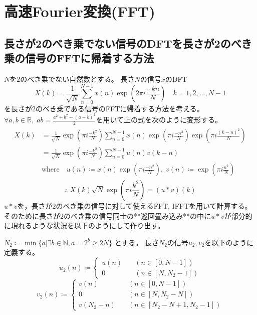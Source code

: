 \chapter{高速Fourier変換(FFT)}
    \section{長さが2のべき乗でない信号のDFTを長さが2のべき乗の信号のFFTに帰着する方法}
        $N$を$2$のべき乗でない自然数とする。
        長さ$N$の信号$x$のDFT
        \[ X(k) = \frac{1}{\sqrt{N}} \sum_{n=0}^{N-1} x(n)\exp \left(2\pi i\frac{-kn}{N}\right) \quad k=1,2,\dots,N-1 \]
        を長さが$2$のべき乗である信号のFFTに帰着する方法を考える。
        $\forall a,b\in\mathbb{R},\;ab = \frac{a^2 + b^2 - (a-b)^2}{2}$を用いて上の式を次のように変形する。
        \begin{align*}
            \begin{aligned}
                X(k) &= \frac{1}{\sqrt{N}} \exp \left(\pi i\frac{-k^2}{N}\right) \sum_{n=0}^{N-1} x(n)\exp \left(\pi i\frac{-n^2}{N}\right) \exp \left(\pi i\frac{(k-n)^2}{N}\right) \\
                &= \frac{1}{\sqrt{N}} \exp \left(\pi i\frac{-k^2}{N}\right) \sum_{n=0}^{N-1} u(n)v(k-n) \\
                & \text{where} \quad u(n) \coloneq x(n)\exp \left(\pi i\frac{-n^2}{N}\right),\;v(n) \coloneq \exp \left(\pi i\frac{n^2}{N}\right)
            \end{aligned}
        \end{align*}
        \[ \therefore\; X(k)\sqrt{N} \exp \left(\pi i\frac{k^2}{N}\right) = (u*v)(k) \]
        $u*v$を，長さが$2$のべき乗の信号に対して使えるFFT, IFFTを用いて計算する。
        そのために長さが$2$のべき乗の信号同士の**巡回畳み込み**の中に$u*v$が部分的に現れるような状況を以下のようにして作り出す。
        \par
        $N_2 \coloneq \min\{a|\exists b\in \mathbb{N}, a = 2^b \geq 2N\}$ とする。
        長さ$N_2$の信号$u_2,v_2$を以下のように定義する。
        \[
            u_2(n) \coloneq \left\{
                \begin{aligned}
                    u(n) &\quad (n \in [0,N-1]) \\
                    0 &\quad (n \in [N,N_2-1])
                \end{aligned}
            \right.
        \]
        \[
            v_2(n) \coloneq \left\{
                \begin{aligned}
                    v(n) &\quad (n \in [0,N-1]) \\
                    0 &\quad (n\in [N,N_2-N]) \\
                    v(N_2-n) &\quad (n \in [N_2-N+1,N_2-1])
                \end{aligned}
            \right.
        \]
